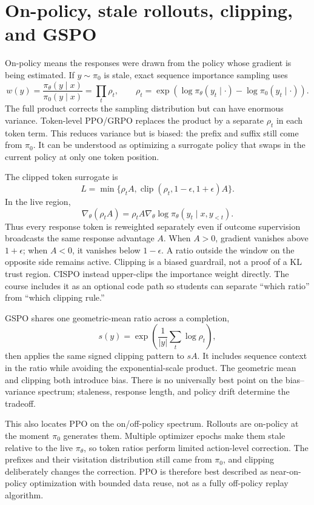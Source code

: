 \documentclass[11pt]{article}
\begin{document}
\section{On-policy, stale rollouts, clipping, and GSPO}

On-policy means the responses were drawn from the policy whose gradient is
being estimated.  If $y\sim\pi_0$ is stale, exact sequence importance sampling
uses
\[
w(y)=\frac{\pi_\theta(y\mid x)}{\pi_0(y\mid x)}
=\prod_t\rho_t,\qquad
\rho_t=\exp(\log\pi_\theta(y_t\mid\cdot)-\log\pi_0(y_t\mid\cdot)).
\]
The full product corrects the sampling distribution but can have enormous
variance.  Token-level PPO/GRPO replaces the product by a separate $\rho_t$ in
each token term.  This reduces variance but is biased: the prefix and suffix
still come from $\pi_0$.  It can be understood as optimizing a surrogate policy
that swaps in the current policy at only one token position.

The clipped token surrogate is
\[
L=\min\{\rho_tA,\operatorname{clip}(\rho_t,1-\epsilon,1+\epsilon)A\}.
\]
In the live region,
\[
\nabla_\theta(\rho_tA)=\rho_tA\nabla_\theta
\log\pi_\theta(y_t\mid x,y_{<t}).
\]
Thus every response token is reweighted separately even if outcome supervision
broadcasts the same response advantage $A$.  When $A>0$, gradient vanishes
above $1+\epsilon$; when $A<0$, it vanishes below $1-\epsilon$.  A ratio outside
the window on the opposite side remains active.  Clipping is a biased guardrail,
not a proof of a KL trust region.
CISPO instead upper-clips the importance weight directly.  The course includes
it as an optional code path so students can separate ``which ratio'' from
``which clipping rule.''

GSPO shares one geometric-mean ratio across a completion,
\[
s(y)=\exp\left(\frac1{|y|}\sum_t\log\rho_t\right),
\]
then applies the same signed clipping pattern to $sA$.  It includes sequence
context in the ratio while avoiding the exponential-scale product.  The
geometric mean and clipping both introduce bias.  There is no universally best
point on the bias--variance spectrum; staleness, response length, and policy
drift determine the tradeoff.

This also locates PPO on the on/off-policy spectrum.  Rollouts are on-policy at
the moment $\pi_0$ generates them.  Multiple optimizer epochs make them stale
relative to the live $\pi_\theta$, so token ratios perform limited action-level
correction.  The prefixes and their visitation distribution still came from
$\pi_0$, and clipping deliberately changes the correction.  PPO is therefore
best described as near-on-policy optimization with bounded data reuse, not as a
fully off-policy replay algorithm.
\end{document}
